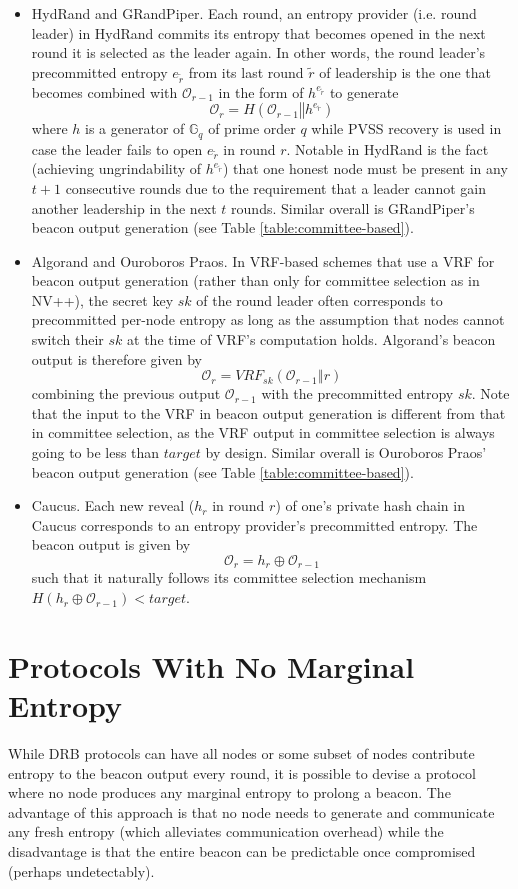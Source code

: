 \documentclass[letterpaper,twocolumn,10pt]{article}
\theoremstyle{definition}
\theoremstyle{remark}
\begin{document}
\begin{itemize}
\item HydRand and GRandPiper. Each round, an entropy provider (i.e. round leader) in HydRand commits its entropy that becomes opened in the next round it is selected as the leader again. In other words, the round leader's precommitted entropy $e_{\tilde{r}}$ from its last round $\tilde{r}$ of leadership is the one that becomes combined with $\mathcal{O}_{r - 1}$ in the form of $h^{e_{\tilde{r}}}$ to generate
\[
\mathcal{O}_r = H(\mathcal{O}_{r - 1} \mathbin\Vert h^{e_{\tilde{r}}})
\]
where $h$ is a generator of $\mathbb{G}_q$ of prime order $q$ while PVSS recovery is used in case the leader fails to open $e_{\tilde{r}}$ in round $r$. Notable in HydRand is the fact (achieving ungrindability of $h^{e_{\tilde{r}}}$) that one honest node must be present in any $t + 1$ consecutive rounds due to the requirement that a leader cannot gain another leadership in the next $t$ rounds. Similar overall is GRandPiper's beacon output generation (see Table \ref{table:committee-based}).
\item Algorand and Ouroboros Praos. In VRF-based schemes that use a VRF for beacon output generation (rather than only for committee selection as in NV++), the secret key $sk$ of the round leader often corresponds to precommitted per-node entropy as long as the assumption that nodes cannot switch their $sk$ at the time of VRF's computation holds. Algorand's beacon output is therefore given by
\[
\mathcal{O}_r = VRF_{sk}(\mathcal{O}_{r - 1} \mathbin\Vert r)
\]
combining the previous output $\mathcal{O}_{r - 1}$ with the precommitted entropy $sk$. Note that the input to the VRF in beacon output generation is different from that in committee selection, as the VRF output in committee selection is always going to be less than $target$ by design. Similar overall is Ouroboros Praos' beacon output generation (see Table \ref{table:committee-based}).
\item Caucus. Each new reveal ($h_r$ in round $r$) of one's private hash chain in Caucus corresponds to an entropy provider's precommitted entropy. The beacon output is given by
\[
\mathcal{O}_r = h_r \oplus \mathcal{O}_{r - 1}
\]
such that it naturally follows its committee selection mechanism $H(h_r \oplus \mathcal{O}_{r - 1}) < target$.
\end{itemize}

\section{Protocols With No Marginal Entropy}
\label{section:dvrf}
While DRB protocols can have all nodes or some subset of nodes contribute entropy to the beacon output every round, it is possible to devise a protocol where no node produces any marginal entropy to prolong a beacon. The advantage of this approach is that no node needs to generate and communicate any fresh entropy (which alleviates communication overhead) while the disadvantage is that the entire beacon can be predictable once compromised (perhaps undetectably).
\end{document}
